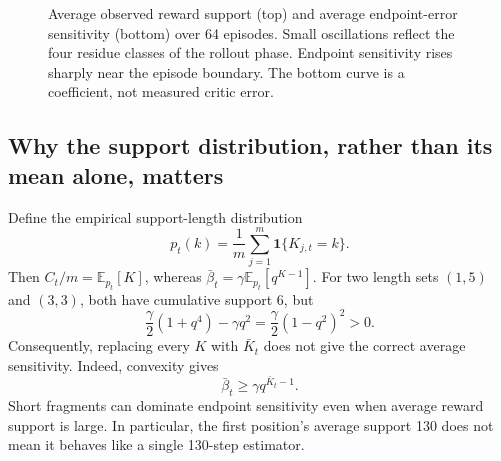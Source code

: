 \documentclass[11pt,a4paper]{article}
\numberwithin{equation}{section}
\newcommand{\E}{\mathbb E}
\newcommand{\ind}{\mathbf 1}
\begin{document}
\begin{figure}[htbp]
\caption{Average observed reward support (top) and average endpoint-error sensitivity (bottom) over 64 episodes. Small oscillations reflect the four residue classes of the rollout phase. Endpoint sensitivity rises sharply near the episode boundary. The bottom curve is a coefficient, not measured critic error.}\label{fig:support}
\end{figure}

\subsection{Why the support distribution, rather than its mean alone, matters}
Define the empirical support-length distribution
\begin{equation}
 p_t(k)=\frac1m\sum_{j=1}^{m}\ind\{K_{j,t}=k\}.
\end{equation}
Then $C_t/m=\E_{p_t}[K]$, whereas
$\bar\beta_t=\gamma\E_{p_t}[q^{K-1}]$.
For two length sets $(1,5)$ and $(3,3)$, both have cumulative support 6, but
\begin{equation}
 \frac\gamma2(1+q^4)-\gamma q^2
 =\frac\gamma2(1-q^2)^2>0.
\end{equation}
Consequently, replacing every $K$ with $\bar K_t$ does not give the correct average
sensitivity. Indeed, convexity gives
\begin{equation}
 \bar\beta_t\ge\gamma q^{\bar K_t-1}.
\end{equation}
Short fragments can dominate endpoint sensitivity even when average reward
support is large. In particular, the first position's average support 130 does
not mean it behaves like a single 130-step estimator.
\end{document}
